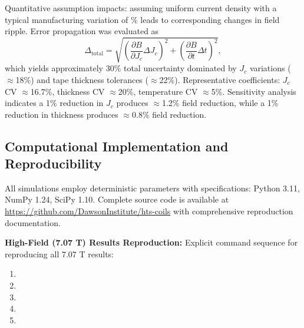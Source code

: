 \documentclass[10pt,twocolumn]{article}
\begin{document}
Quantitative assumption impacts: assuming uniform current density with a typical manufacturing variation of \% leads to corresponding changes in field ripple. Error propagation was evaluated as
\begin{equation}
\Delta_{\text{total}} = \sqrt{\left(\frac{\partial B}{\partial J_c}\Delta J_c\right)^2 + \left(\frac{\partial B}{\partial t}\Delta t\right)^2},
\end{equation}
which yields approximately 30\% total uncertainty dominated by $J_c$ variations ($\approx$18\%) and tape thickness tolerances ($\approx$22\%). Representative coefficients: $J_c$ CV $\approx$16.7\%, thickness CV $\approx$20\%, temperature CV $\approx$5\%. Sensitivity analysis indicates a 1\% reduction in $J_c$ produces $\approx$1.2\% field reduction, while a 1\% reduction in thickness produces $\approx$0.8\% field reduction.

\subsection{Computational Implementation and Reproducibility}

All simulations employ deterministic parameters with specifications: Python 3.11, NumPy 1.24, SciPy 1.10. Complete source code is available at \url{https://github.com/DawsonInstitute/hts-coils} with comprehensive reproduction documentation.

			\textbf{High-Field (7.07 T) Results Reproduction:} Explicit command sequence for reproducing all 7.07 T results:
{\scriptsize\raggedright
\begin{enumerate}
\item \begin{minipage}[t]{\columnwidth}\ttfamily{}\end{minipage}
\item \begin{minipage}[t]{\columnwidth}\ttfamily{}\end{minipage}
\item \begin{minipage}[t]{\columnwidth}\ttfamily{}\end{minipage}
\item \begin{minipage}[t]{\columnwidth}\ttfamily{}\end{minipage}
\item \begin{minipage}[t]{\columnwidth}\ttfamily{}\end{minipage}
\end{enumerate}
}
\end{document}
